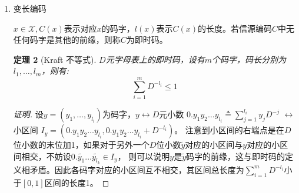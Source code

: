 \documentclass{article}
\newtheorem{definition}{定义}
\newtheorem{thm}{定理}
\begin{document}
\begin{enumerate}
\begin{enumerate}[label=(\alph*)]
\begin{proof}[证明]
$$$$
\begin{align*}
|A_{\epsilon}^{(n)}| & = \sum_{\bm{x}\in A_{\epsilon}^{(n)}} 1 \\
 & \geq \sum_{\bm{x}\in A_{\epsilon}^{(n)}} p(x_1,\dots,x_n) 2^{n[H(X)-\epsilon]} \\
 & \geq (1-\epsilon)2^{n[H(X)-\epsilon]} 
\end{align*}
\end{proof}
\end{enumerate}
\begin{definition}
如果$\forall \delta>0$，当$n$充分大时，$\Pr\{B^{(n)}_{\delta}\}\geq 1-\delta$，
则称$B_{\delta}^{(n)}\subset \mathcal{X}^n$为包含大多数概率的子集（高概率集）。
\end{definition}
下面的定理说明$A_{\epsilon}^{(n)}$ 在一阶指数意义下是最小的高概率集：
\begin{thm}
设$X_1,\dots,X_n$ i.i.d. $\sim p(x)$,固定$\delta <\frac{1}{2}$ 及$B_{\delta}^{(n)}$，则对$\forall \delta'>0$,当$n$充分大时，
\begin{equation}
\frac{1}{n}\log |B_{\delta}^{(n)}| \geq H(X_1)-\delta'
\end{equation}
\end{thm}
\begin{proof}[证明]
由$P(A\cap B)>1-P(\bar{A})-P(\bar{B})$得到当$n$充分大时，
$$
P(B_{\delta}^{(n)} \cap A_{\epsilon}^{(n)}) >1-\epsilon-\delta
$$
\begin{align*}
|B_{\delta}^{(n)}| & \geq |B_{\delta}^{(n)} \cap A_{\epsilon}^{(n)}| \\
& = \sum_{\bm{x}\in B_{\delta}^{(n)} \cap A_{\epsilon}^{(n)}} 1 \\
& \geq \sum_{\bm{x}\in B_{\delta}^{(n)} \cap A_{\epsilon}^{(n)}}p(x_1,\dots,x_n)2^{n[H(x)-\epsilon]}\\
& \geq (1-\epsilon-\delta)2^{n[H(x)-\epsilon]}
\end{align*}
\end{proof}
\item 变长编码

$x\in \mathcal{X},C(x)$表示对应$x$的码字，$l(x)$表示$C(x)$的长度。若信源编码$C$中无任何码字是其他的前缘，则称$C$为即时码。
\begin{thm}[Kraft 不等式]\label{thm:Kraft}
$D$元字母表上的即时码，设有$m$个码字，码长分别为$l_1,\dots,l_m$，则有:
\begin{equation}
\sum_{i=1}^m D^{-l_i} \leq 1
\end{equation}
\end{thm}
\begin{proof}[证明]
设$y=(y_1,\dots,y_{l_i})$为码字，$y\leftrightarrow D$元小数 $0.y_1y_2\dots y_{l_i}\triangleq \sum_{j=1}^{l_i}y_j D^{-j}$
$\leftrightarrow$ 小区间 $I_{y}=(0.y_1y_2\dots y_{l_i},0.y_1y_2\dots y_{l_i}+D^{-l_i})$。
注意到小区间的右端点是在$D$位小数的末位加1，如果对于另外一个$D$位小数$\tilde{y}$对应的小区间与$y$对应的小区间相交，不妨设$0.\tilde{y_1}\dots\tilde{y_{l_k}}\in I_{y}$，
则可以说明$y$是$\tilde{y}$码字的前缘，这与即时码的定义相矛盾。因此各码字对应的小区间互不相交，其区间总长度为$\sum_{i=1}^m D^{-l_i}$小于$[0,1]$区间的长度1。


\end{proof}
\end{enumerate}
\end{document}
